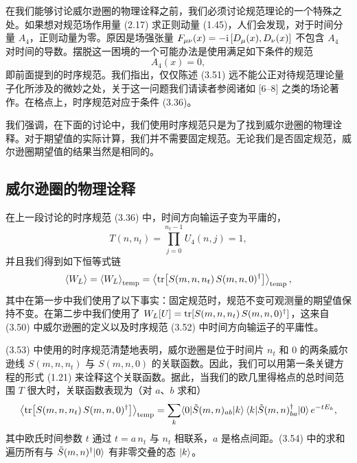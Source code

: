 在我们能够讨论威尔逊圈的物理诠释之前，我们必须讨论规范理论的一个特殊之处。如果想对规范场作用量 (2.17) 求正则动量 (1.45)，人们会发现，对于时间分量 $A_4$，正则动量为零。原因是场强张量 $F_{\mu\nu}(x) = -\mathrm{i}\,[D_\mu(x), D_\nu(x)]$ 不包含 $A_4$ 对时间的导数。摆脱这一困境的一个可能办法是使用满足如下条件的规范
\begin{equation}
  A_4(x) = 0 ,
\end{equation}
即前面提到的时序规范。我们指出，仅仅陈述 (3.51) 远不能公正对待规范理论量子化所涉及的微妙之处，关于这一问题我们请读者参阅诸如 [6--8] 之类的场论著作。在格点上，时序规范对应于条件 (3.36)。

我们强调，在下面的讨论中，我们使用时序规范只是为了找到威尔逊圈的物理诠释。对于期望值的实际计算，我们并不需要固定规范。无论我们是否固定规范，威尔逊圈期望值的结果当然是相同的。

\subsection{威尔逊圈的物理诠释}

在上一段讨论的时序规范 (3.36) 中，时间方向输运子变为平庸的，
\begin{equation}
  T(n, n_t) = \prod_{j=0}^{n_t-1} U_4(n, j) = 1 ,
\end{equation}
并且我们得到如下恒等式链
\begin{equation}
  \left\langle W_L \right\rangle = \left\langle W_L \right\rangle_{\mathrm{temp}}
  = \left\langle \operatorname{tr}\!\left[S(m, n, n_t)\,S(m, n, 0)^\dagger\right] \right\rangle_{\mathrm{temp}} ,
\end{equation}
其中在第一步中我们使用了以下事实：固定规范时，规范不变可观测量的期望值保持不变。在第二步中我们使用了 $W_L[U] = \operatorname{tr}[S(m, n, n_t)\,S(m, n, 0)^\dagger]$，这来自 (3.50) 中威尔逊圈的定义以及时序规范 (3.52) 中时间方向输运子的平庸性。

(3.53) 中使用的时序规范清楚地表明，威尔逊圈是位于时间片 $n_t$ 和 0 的两条威尔逊线 $S(m, n, n_t)$ 与 $S(m, n, 0)$ 的关联函数。因此，我们可以用第一条关键方程的形式 (1.21) 来诠释这个关联函数。据此，当我们的欧几里得格点的总时间范围 $T$ 很大时，关联函数表现为（对 $a$、$b$ 求和）
\begin{equation}
  \left\langle \operatorname{tr}\!\left[S(m, n, n_t)\,S(m, n, 0)^\dagger\right] \right\rangle_{\mathrm{temp}}
  = \sum_k \langle0|\tilde S(m,n)_{ab}|k\rangle\,
    \langle k|\tilde S(m,n)^\dagger_{ba}|0\rangle\, e^{-tE_k} ,
\end{equation}
其中欧氏时间参数 $t$ 通过 $t = a\,n_t$ 与 $n_t$ 相联系，$a$ 是格点间距。(3.54) 中的求和遍历所有与 $\tilde S(m,n)^\dagger|0\rangle$ 有非零交叠的态 $|k\rangle$。

